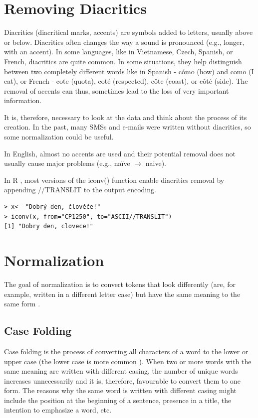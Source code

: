 \documentclass[11pt,openany,executivepaper]{book}
\begin{document}
\section{Removing Diacritics}

Diacritics (diacritical marks, accents) are symbols added to letters, usually above or below. Diacritics often changes the way a sound is pronounced (e.g., longer, with an accent). In some languages, like in Vietnamese, Czech, Spanish, or French, diacritics are quite common. In some situations, they help distinguish between two completely different words like in Spanish - cómo (how) and como (I eat), or French - cote (quota), coté (respected), côte (coast), or côté (side). The removal of accents can thus, sometimes lead to the loss of very important information.

It is, therefore, necessary to look at the data and think about the process of its creation. In the past, many SMSs and e-mails were written without diacritics, so some normalization could be useful.

In English, almost no accents are used and their potential removal does not usually cause major problems (e.g., naïve $\rightarrow$ naive).

In R , most versions of the iconv() function enable diacritics removal by appending //TRANSLIT to the output encoding.

\begin{verbatim}
> x<- "Dobrý den, člověče!"
> iconv(x, from="CP1250", to="ASCII//TRANSLIT")
[1] "Dobry den, clovece!"
\end{verbatim}

\section{Normalization}
The goal of normalization is to convert tokens that look differently (are, for example, written in a different letter case) but have the same meaning to the same form \cite{263}.

\subsection{Case Folding}
Case folding is the process of converting all characters of a word to the lower or upper case (the lower case is more common \cite{62}). When two or more words with the same meaning are written with different casing, the number of unique words increases unnecessarily and it is, therefore, favourable to convert them to one form. The reasons why the same word is written with different casing might include the position at the beginning of a sentence, presence in a title, the intention to emphasize a word, etc.
\end{document}
